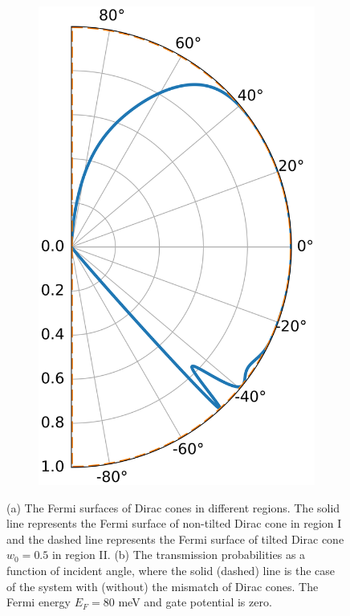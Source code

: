 \begin{figure}[H]
\begin{subfigure}[b]{0.3\linewidth}
                \includegraphics[width=\linewidth]{fig/real vs pseudo.png}
                \caption{}
                \label{fig:real vs pseudo}
            \end{subfigure}
        \caption{(a) The Fermi surfaces of Dirac cones in different regions. 
                    The solid line represents the Fermi surface of non-tilted Dirac cone in region I and the dashed line represents the Fermi surface of tilted Dirac cone $w_0=0.5$ in region II. 
                    (b) The transmission probabilities as a function of incident angle, where the solid (dashed) line is the case of the system with (without) the mismatch of Dirac cones. 
                    The Fermi energy $E_F=80$ meV and gate potential is zero.}
    \end{figure}

